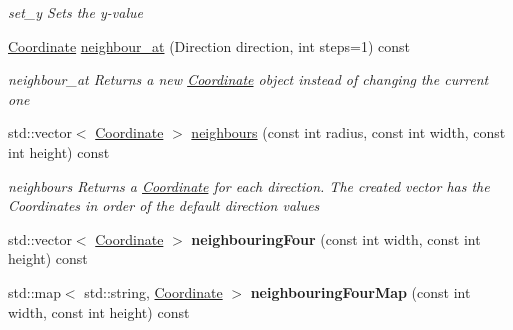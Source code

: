 \begin{DoxyCompactItemize}
\begin{DoxyCompactList}\small\item\em set\-\_\-y Sets the y-\/value \end{DoxyCompactList}\item 
\hyperlink{class_course_1_1_coordinate}{Coordinate} \hyperlink{class_course_1_1_coordinate_acb85bffdc4849e12e955072c3d52b9f8}{neighbour\-\_\-at} (Direction direction, int steps=1) const 
\begin{DoxyCompactList}\small\item\em neighbour\-\_\-at Returns a new \hyperlink{class_course_1_1_coordinate}{Coordinate} object instead of changing the current one \end{DoxyCompactList}\item 
std\-::vector$<$ \hyperlink{class_course_1_1_coordinate}{Coordinate} $>$ \hyperlink{class_course_1_1_coordinate_ae1e8f50877d1fd6b74cb4645c38c45f9}{neighbours} (const int radius, const int width, const int height) const 
\begin{DoxyCompactList}\small\item\em neighbours Returns a \hyperlink{class_course_1_1_coordinate}{Coordinate} for each direction. The created vector has the Coordinates in order of the default direction values \end{DoxyCompactList}\item 
\hypertarget{class_course_1_1_coordinate_a3438cd3d4c6e738e12d846d66c024877}{std\-::vector$<$ \hyperlink{class_course_1_1_coordinate}{Coordinate} $>$ {\bfseries neighbouring\-Four} (const int width, const int height) const }\label{class_course_1_1_coordinate_a3438cd3d4c6e738e12d846d66c024877}

\item 
\hypertarget{class_course_1_1_coordinate_a1410e6c2cf8e3d2696385cdd1c5ae987}{std\-::map$<$ std\-::string, \hyperlink{class_course_1_1_coordinate}{Coordinate} $>$ {\bfseries neighbouring\-Four\-Map} (const int width, const int height) const }\label{class_course_1_1_coordinate_a1410e6c2cf8e3d2696385cdd1c5ae987}


\end{DoxyCompactItemize}
